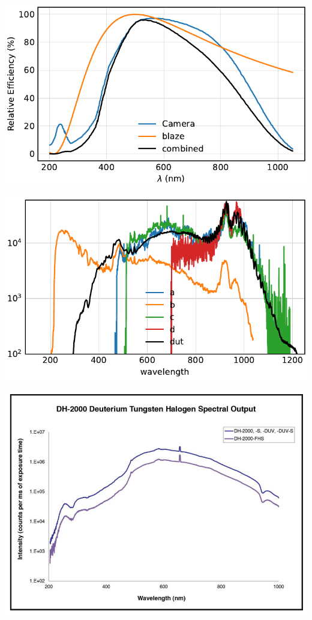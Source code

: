

\begin{frame}
	\centering
	\includegraphics{../analysis/figures/expected.pdf}
\end{frame}

\begin{frame}
	\centering
	\includegraphics{../analysis/figures/efficiency_different.pdf}
\end{frame}

\begin{frame}
	\centering
	\includegraphics[width=.8\textwidth]{./figures/dh-2000.png}
\end{frame}